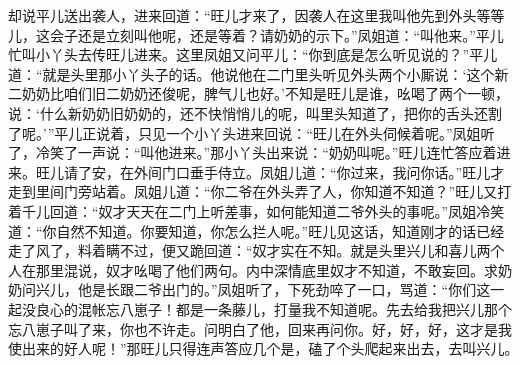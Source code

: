 \documentclass[12pt,oneside]{book}
\begin{document}
却说平儿送出袭人，进来回道：“旺儿才来了，因袭人在这里我叫他先到外头等等儿，这会子还是立刻叫他呢，还是等着？请奶奶的示下。”凤姐道：“叫他来。”平儿忙叫小丫头去传旺儿进来。这里凤姐又问平儿：“你到底是怎么听见说的？”平儿道：“就是头里那小丫头子的话。他说他在二门里头听见外头两个小厮说：‘这个新二奶奶比咱们旧二奶奶还俊呢，脾气儿也好。’不知是旺儿是谁，吆喝了两个一顿，说：‘什么新奶奶旧奶奶的，还不快悄悄儿的呢，叫里头知道了，把你的舌头还割了呢。’”平儿正说着，只见一个小丫头进来回说：“旺儿在外头伺候着呢。”凤姐听了，冷笑了一声说：“叫他进来。”那小丫头出来说：“奶奶叫呢。”旺儿连忙答应着进来。旺儿请了安，在外间门口垂手侍立。凤姐儿道：“你过来，我问你话。”旺儿才走到里间门旁站着。凤姐儿道：“你二爷在外头弄了人，你知道不知道？”旺儿又打着千儿回道：“奴才天天在二门上听差事，如何能知道二爷外头的事呢。”凤姐冷笑道：“你自然不知道。你要知道，你怎么拦人呢。”旺儿见这话，知道刚才的话已经走了风了，料着瞒不过，便又跪回道：“奴才实在不知。就是头里兴儿和喜儿两个人在那里混说，奴才吆喝了他们两句。内中深情底里奴才不知道，不敢妄回。求奶奶问兴儿，他是长跟二爷出门的。”凤姐听了，下死劲啐了一口，骂道：“你们这一起没良心的混帐忘八崽子！都是一条藤儿，打量我不知道呢。先去给我把兴儿那个忘八崽子叫了来，你也不许走。问明白了他，回来再问你。好，好，好，这才是我使出来的好人呢！”那旺儿只得连声答应几个是，磕了个头爬起来出去，去叫兴儿。　
　
\end{document}
